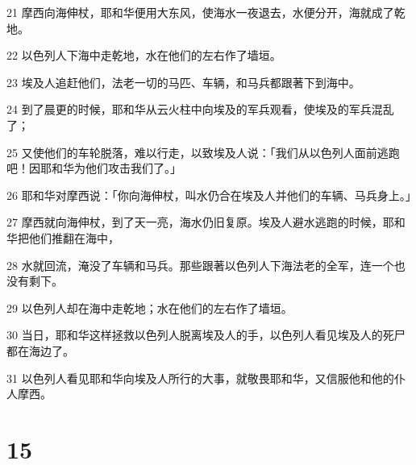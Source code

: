 \par 21 摩西向海伸杖，耶和华便用大东风，使海水一夜退去，水便分开，海就成了乾地。
\par 22 以色列人下海中走乾地，水在他们的左右作了墙垣。
\par 23 埃及人追赶他们，法老一切的马匹、车辆，和马兵都跟著下到海中。
\par 24 到了晨更的时候，耶和华从云火柱中向埃及的军兵观看，使埃及的军兵混乱了；
\par 25 又使他们的车轮脱落，难以行走，以致埃及人说：「我们从以色列人面前逃跑吧！因耶和华为他们攻击我们了。」
\par 26 耶和华对摩西说：「你向海伸杖，叫水仍合在埃及人并他们的车辆、马兵身上。」
\par 27 摩西就向海伸杖，到了天一亮，海水仍旧复原。埃及人避水逃跑的时候，耶和华把他们推翻在海中，
\par 28 水就回流，淹没了车辆和马兵。那些跟著以色列人下海法老的全军，连一个也没有剩下。
\par 29 以色列人却在海中走乾地；水在他们的左右作了墙垣。
\par 30 当日，耶和华这样拯救以色列人脱离埃及人的手，以色列人看见埃及人的死尸都在海边了。
\par 31 以色列人看见耶和华向埃及人所行的大事，就敬畏耶和华，又信服他和他的仆人摩西。

\chapter{15}

